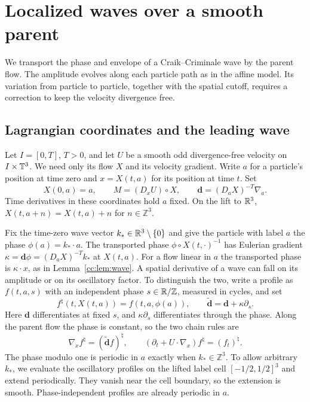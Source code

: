 \section{Localized waves over a smooth parent}\label{cc:sec:localized}
We transport the phase and envelope of a Craik--Criminale wave by the
parent flow. The amplitude evolves along each particle path as in the
affine model. Its variation from particle to particle, together with the
spatial cutoff, requires a correction to keep the velocity divergence free.

\subsection{Lagrangian coordinates and the leading wave}\label{cc:sec:material}
Let $I=[0,T]$, $T>0$, and let $U$ be a smooth odd divergence-free
velocity on $I\times\mathbb T^3$. We need only its flow $X$ and its velocity
gradient. Write $a$ for a particle's position at time zero and
$x=X(t,a)$ for its position at time $t$. Set
\[
 X(0,a)=a,\qquad M=(D_xU)\circ X,\qquad
 \mathbf d=(D_aX)^{-T}\nabla_a .
\]
Time derivatives in these coordinates hold $a$ fixed.
On the lift to $\mathbb R^3$, $X(t,a+n)=X(t,a)+n$ for $n\in\mathbb Z^3$.

Fix the time-zero wave vector $k_*\in\mathbb R^3\setminus\{0\}$ and give the
particle with label $a$ the phase $\phi(a)=k_*\cdot a$.
The transported phase $\phi\circ X(t,\cdot)^{-1}$
has Eulerian gradient $\kappa=\mathbf d\phi=(D_aX)^{-T}k_*$ at $X(t,a)$.
For a flow linear in $a$ the transported phase is $\kappa\cdot x$, as in
Lemma~\ref{cc:lem:wave}.
A spatial derivative of a wave can fall on its amplitude or on its
oscillatory factor. To distinguish the two, write a profile as $f(t,a,s)$
with an independent phase $s\in\mathbb R/\mathbb Z$, measured in cycles, and set
\[
 f^\natural(t,X(t,a))=f(t,a,\phi(a)),\qquad
 \widetilde{\mathbf d}=\mathbf d+\kappa\partial_s .
\]
Here $\mathbf d$ differentiates at fixed $s$, and $\kappa\partial_s$
differentiates through the phase. Along the parent flow the phase is
constant, so the two chain rules are
\begin{equation}\label{cc:uf:hier:eq:graph}
 \nabla_x f^\natural=(\widetilde{\mathbf d}f)^\natural,\qquad
 (\partial_t+U\cdot\nabla_x)f^\natural=(f_t)^\natural.
\end{equation}
The phase modulo one is periodic in $a$ exactly when $k_*\in\mathbb Z^3$.
To allow arbitrary $k_*$, we evaluate the oscillatory profiles on the
lifted label cell $[-1/2,1/2]^3$ and extend periodically. They vanish near
the cell boundary, so the extension is smooth. Phase-independent profiles
are already periodic in $a$.

